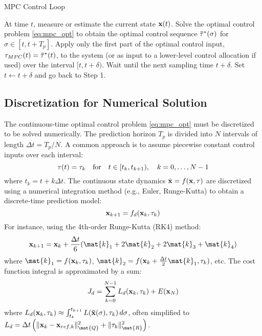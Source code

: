 \begin{algorithm}[H]
\caption{MPC Control Loop}
\label{alg:mpc_loop}
\begin{algorithmic}[1]
    \State At time $t$, measure or estimate the current state $\mathbf{x}(t)$.
    \State Solve the optimal control problem \eqref{eq:mpc_opt} to obtain the optimal control sequence $\mathbf{\bar{\tau}}^*(\sigma)$ for $\sigma \in [t, t+T_p]$.
    \State Apply only the first part of the optimal control input, $\mathbf{\tau}_{MPC}(t) = \mathbf{\bar{\tau}}^*(t)$, to the system (or as input to a lower-level control allocation if used) over the interval $[t, t+\delta)$.
    \State Wait until the next sampling time $t+\delta$. Set $t \leftarrow t+\delta$ and go back to Step 1.
\end{algorithmic}
\end{algorithm}

\subsection{Discretization for Numerical Solution}
The continuous-time optimal control problem \eqref{eq:mpc_opt} must be discretized to be solved numerically. The prediction horizon $T_p$ is divided into $N$ intervals of length $\Delta t = T_p/N$. A common approach is to assume piecewise constant control inputs over each interval:
\begin{equation}
    \mathbf{\tau}(t) = \mathbf{\tau}_k \quad \text{for} \quad t \in [t_k, t_{k+1}), \quad k = 0, \dots, N-1
\end{equation}
where $t_k = t + k\Delta t$. The continuous state dynamics $\dot{\mathbf{x}} = f(\mathbf{x}, \mathbf{\tau})$ are discretized using a numerical integration method (e.g., Euler, Runge-Kutta) to obtain a discrete-time prediction model:
\begin{equation}
    \mathbf{x}_{k+1} = f_d(\mathbf{x}_k, \mathbf{\tau}_k)
\end{equation}
For instance, using the 4th-order Runge-Kutta (RK4) method:
\begin{equation}
    \vect{x}_{k+1} = \vect{x}_k + \frac{\Delta t}{6}(\mat{k}_1 + 2\mat{k}_2 + 2\mat{k}_3 + \mat{k}_4)
\end{equation}
where $\mat{k}_1 = f(\vect{x}_k, \vect{\tau}_k)$, $\mat{k}_2 = f(\vect{x}_k + \frac{\Delta t}{2}\mat{k}_1, \vect{\tau}_k)$, etc.
The cost function integral is approximated by a sum:
\begin{equation}
    J_d = \sum_{k=0}^{N-1} L_d(\mathbf{x}_k, \mathbf{\tau}_k) + E(\mathbf{x}_N)
\end{equation}
where $L_d(\mathbf{x}_k, \mathbf{\tau}_k) \approx \int_{t_k}^{t_{k+1}} L(\mathbf{\bar{x}}(\sigma), \mathbf{\tau}_k) \, d\sigma$, often simplified to $L_d = \Delta t \left( \|\vect{x}_k - \vect{x}_{ref,k}\|_{\mat{Q}}^2 + \|\vect{\tau}_k\|_{\mat{R}}^2 \right)$.

